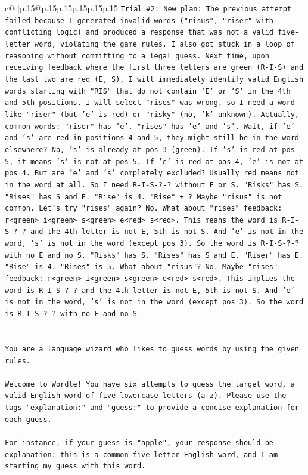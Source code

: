 \documentclass{article}
\begin{document}
{\begin{supertabular}{c@{$\;$}|p{.15\linewidth}@{}p{.15\linewidth}p{.15\linewidth}p{.15\linewidth}p{.15\linewidth}p{.15\linewidth}}
{{{\texttt{Trial \#2: New plan: The previous attempt failed because I generated invalid words ("risus", "riser" with conflicting logic) and produced a response that was not a valid five{-}letter word, violating the game rules. I also got stuck in a loop of reasoning without committing to a legal guess. Next time, upon receiving feedback where the first three letters are green (R{-}I{-}S) and the last two are red (E, S), I will immediately identify valid English words starting with "RIS" that do not contain 'E' or 'S' in the 4th and 5th positions. I will select "rises" was wrong, so I need a word like "riser" (but 'e' is red) or "risky" (no, 'k' unknown). Actually, common words: "riser" has 'e'. "rises" has 'e' and 's'. Wait, if 'e' and 's' are red in positions 4 and 5, they might still be in the word elsewhere? No, 's' is already at pos 3 (green). If 's' is red at pos 5, it means 's' is not at pos 5. If 'e' is red at pos 4, 'e' is not at pos 4. But are 'e' and 's' completely excluded? Usually red means not in the word at all. So I need R{-}I{-}S{-}?{-}? without E or S. "Risks" has S. "Rises" has S and E. "Rise" is 4. "Rise" + ? Maybe "risus" is not common. Let's try "rises" again? No. What about "rises" feedback: r<green> i<green> s<green> e<red> s<red>. This means the word is R{-}I{-}S{-}?{-}? and the 4th letter is not E, 5th is not S. And 'e' is not in the word, 's' is not in the word (except pos 3). So the word is R{-}I{-}S{-}?{-}? with no E and no S. "Risks" has S. "Rises" has S and E. "Riser" has E. "Rise" is 4. "Rises" is 5. What about "risus"? No. Maybe "rises" feedback: r<green> i<green> s<green> e<red> s<red>. This implies the word is R{-}I{-}S{-}?{-}? and the 4th letter is not E, 5th is not S. And 'e' is not in the word, 's' is not in the word (except pos 3). So the word is R{-}I{-}S{-}?{-}? with no E and no S} \\
\\ 
\\ 
\texttt{You are a language wizard who likes to guess words by using the given rules.} \\
\\ 
\texttt{Welcome to Wordle! You have six attempts to guess the target word, a valid English word of five lowercase letters (a{-}z). Please use the tags "explanation:" and "guess:" to provide a concise explanation for each guess.} \\
\\ 
\texttt{For instance, if your guess is "apple", your response should be} \\
\texttt{explanation: this is a common five{-}letter English word, and I am starting my guess with this word.} \\
}}}
\end{supertabular}}
\end{document}
